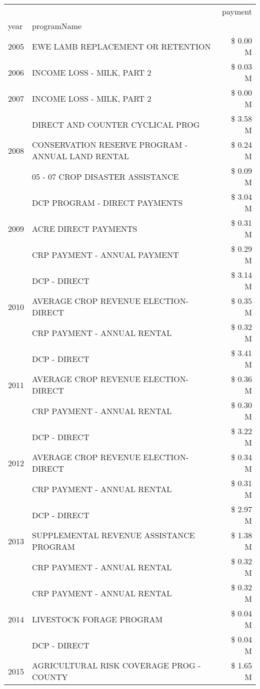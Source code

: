 \begin{tabular}{llr}
\toprule
 &  & payment \\
year & programName &  \\
\midrule
2005 & EWE LAMB REPLACEMENT OR RETENTION & \$ 0.00 M \\
\cline{1-3}
2006 & INCOME LOSS - MILK, PART 2 & \$ 0.03 M \\
\cline{1-3}
2007 & INCOME LOSS - MILK, PART 2 & \$ 0.00 M \\
\cline{1-3}
\multirow[t]{3}{*}{2008} & DIRECT AND COUNTER CYCLICAL PROG & \$ 3.58 M \\
 & CONSERVATION RESERVE PROGRAM - ANNUAL LAND RENTAL & \$ 0.24 M \\
 & 05 - 07 CROP DISASTER ASSISTANCE & \$ 0.09 M \\
\cline{1-3}
\multirow[t]{3}{*}{2009} & DCP PROGRAM - DIRECT PAYMENTS & \$ 3.04 M \\
 & ACRE DIRECT PAYMENTS & \$ 0.31 M \\
 & CRP PAYMENT - ANNUAL PAYMENT & \$ 0.29 M \\
\cline{1-3}
\multirow[t]{3}{*}{2010} & DCP - DIRECT & \$ 3.14 M \\
 & AVERAGE CROP REVENUE ELECTION-DIRECT & \$ 0.35 M \\
 & CRP PAYMENT - ANNUAL RENTAL & \$ 0.32 M \\
\cline{1-3}
\multirow[t]{3}{*}{2011} & DCP - DIRECT & \$ 3.41 M \\
 & AVERAGE CROP REVENUE ELECTION-DIRECT & \$ 0.36 M \\
 & CRP PAYMENT - ANNUAL RENTAL & \$ 0.30 M \\
\cline{1-3}
\multirow[t]{3}{*}{2012} & DCP - DIRECT & \$ 3.22 M \\
 & AVERAGE CROP REVENUE ELECTION-DIRECT & \$ 0.34 M \\
 & CRP PAYMENT - ANNUAL RENTAL & \$ 0.31 M \\
\cline{1-3}
\multirow[t]{3}{*}{2013} & DCP - DIRECT & \$ 2.97 M \\
 & SUPPLEMENTAL REVENUE ASSISTANCE PROGRAM & \$ 1.38 M \\
 & CRP PAYMENT - ANNUAL RENTAL & \$ 0.32 M \\
\cline{1-3}
\multirow[t]{3}{*}{2014} & CRP PAYMENT - ANNUAL RENTAL & \$ 0.32 M \\
 & LIVESTOCK FORAGE PROGRAM & \$ 0.04 M \\
 & DCP - DIRECT & \$ 0.04 M \\
\cline{1-3}
\multirow[t]{3}{*}{2015} & AGRICULTURAL RISK COVERAGE PROG - COUNTY & \$ 1.65 M \\

\end{tabular}
